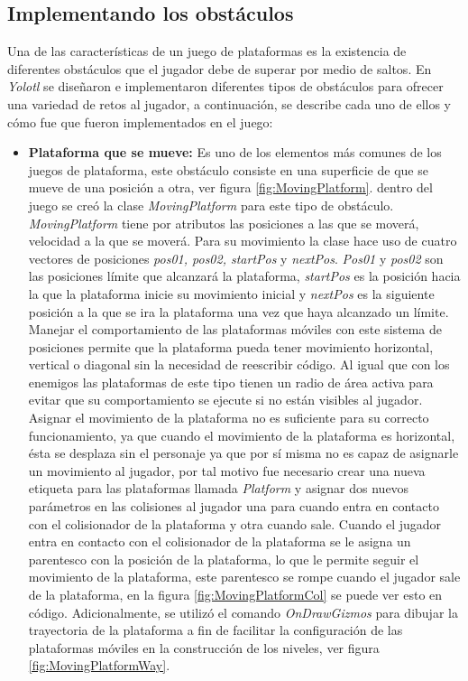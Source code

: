 \subsection{Implementando los obstáculos}
Una de las características de un juego de plataformas es la existencia de diferentes
obstáculos que el jugador debe de superar por medio de saltos\cite{Ref_JuegoDisenio}.
En \textit{Yolotl} se diseñaron e implementaron diferentes tipos de obstáculos
para ofrecer una variedad de retos al jugador, a continuación, se describe cada
uno de ellos y cómo fue que fueron implementados en el juego:
    \begin{itemize}
        \item \textbf{Plataforma que se mueve:} Es uno de los elementos más comunes de
        los juegos de plataforma, este   obstáculo consiste en una superficie de que
        se mueve de una posición a otra, ver figura \ref{fig:MovingPlatform}. dentro
        del juego se creó la clase \textit{MovingPlatform} para este tipo de obstáculo.
        \textit{MovingPlatform} tiene por atributos las posiciones a las que se moverá,
        velocidad a la que se moverá. Para su movimiento la clase hace uso de cuatro
        vectores de posiciones \textit{pos01, pos02, startPos} y \textit{nextPos}.
        \textit{Pos01} y \textit{pos02} son las posiciones límite que alcanzará la
        plataforma, \textit{startPos} es la posición hacia la que la plataforma inicie
        su movimiento inicial y \textit{nextPos} es la siguiente posición a la que se
        ira la plataforma una vez que haya alcanzado un límite. Manejar el
        comportamiento de las plataformas móviles con este sistema de posiciones
        permite que la plataforma pueda tener movimiento horizontal, vertical o diagonal
        sin la necesidad de reescribir código. Al igual que con los enemigos las
        plataformas de este tipo tienen un radio de área activa para evitar que su
        comportamiento se ejecute si no están visibles al jugador. Asignar el movimiento
        de la plataforma no es suficiente para su correcto funcionamiento, ya que
        cuando el movimiento de la plataforma es horizontal, ésta se desplaza sin el
        personaje ya que por sí misma no es capaz de asignarle un movimiento al jugador,
        por tal motivo fue necesario crear una nueva etiqueta para las plataformas
        llamada \textit{Platform} y asignar dos nuevos parámetros en las colisiones
        al jugador
        una para cuando entra en contacto con el colisionador de la plataforma y otra
        cuando sale. Cuando el jugador entra en contacto con el colisionador de la
        plataforma se le asigna un parentesco con la posición de la plataforma, lo
        que le permite seguir el movimiento de la plataforma, este parentesco se
        rompe cuando el jugador sale de la plataforma, en la figura
        \ref{fig:MovingPlatformCol} se puede ver esto en código. Adicionalmente,
        se utilizó el comando \textit{OnDrawGizmos} para dibujar la trayectoria de la
        plataforma a fin de facilitar la configuración de las plataformas móviles en la
        construcción de los niveles, ver figura \ref{fig:MovingPlatformWay}.
            

\end{itemize}
